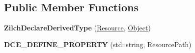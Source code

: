 \subsection*{Public Member Functions}
\begin{DoxyCompactItemize}
\item 
\hypertarget{classDCEngine_1_1Resource_abdc8f2f4cb6dacff7adae08d0aea3826}{{\bfseries Zilch\-Declare\-Derived\-Type} (\hyperlink{classDCEngine_1_1Resource}{Resource}, \hyperlink{classDCEngine_1_1Object}{Object})}\label{classDCEngine_1_1Resource_abdc8f2f4cb6dacff7adae08d0aea3826}

\item 
\hypertarget{classDCEngine_1_1Resource_a819369e5a22a4edadbeec0e13c3ae3fc}{{\bfseries D\-C\-E\-\_\-\-D\-E\-F\-I\-N\-E\-\_\-\-P\-R\-O\-P\-E\-R\-T\-Y} (std\-::string, Resource\-Path)}\label{classDCEngine_1_1Resource_a819369e5a22a4edadbeec0e13c3ae3fc}


\end{DoxyCompactItemize}
